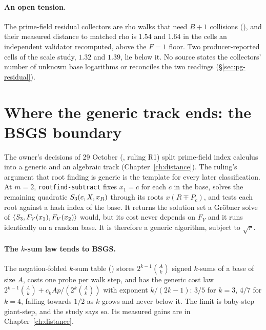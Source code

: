 \paragraph{An open tension.} The prime-field residual collectors are
rho walks that need $B+1$ collisions
(), and their measured
distance to matched rho is $1.54$ and $1.64$ in the cells an independent
validator recomputed, above the $F=1$ floor. Two producer-reported cells of
the scale study, $1.32$ and $1.39$, lie below it. No source states the
collectors' number of unknown base logarithms or reconciles the two readings
(\S\ref{sec:pg-residual}).

\section{Where the generic track ends: the BSGS boundary}\label{sec:gf-bsgs}

The owner's decisions of 29 October
(, ruling R1) split
prime-field index calculus into a generic and an algebraic track
(Chapter~\ref{ch:distance}). The ruling's argument that root finding is
generic is the template for every later classification. At $m=2$, \texttt{rootfind-subtract} fixes $x_1=c$ for each
$c$ in the base, solves the remaining quadratic $S_{3}(c,X,x_R)$ through
its roots $x(R\mp P_c)$, and tests each root against a hash index of the
base. It returns the solution set a Gr\"obner solve of
$\langle S_{3},F_V(x_1),F_V(x_2)\rangle$ would, but its cost never depends
on $F_V$ and it runs identically on a random base. It is therefore a
generic algorithm, subject to $\sqrt r$.

\paragraph{The $k$-sum law tends to BSGS.} The negation-folded $k$-sum table
() stores
$2^{k-1}\binom{A}{k}$ signed $k$-sums of a base of size $A$, costs one probe
per walk step, and has the generic cost law
$2^{k-1}\binom Ak+c_kAp/(2^k\binom Ak)$ with exponent $k/(2k-1)$: $3/5$ for
$k=3$, $4/7$ for $k=4$, falling towards $1/2$ as $k$ grows and never below
it. The limit is baby-step giant-step, and the study says so. Its measured
gains are in Chapter~\ref{ch:distance}.


